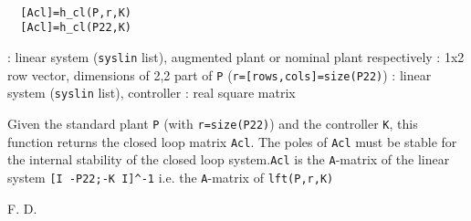 \begin{mandesc}
   \\ %
\end{mandesc}
\begin{calling_sequence}
\begin{verbatim}
  [Acl]=h_cl(P,r,K)  
  [Acl]=h_cl(P22,K)  
\end{verbatim}
\end{calling_sequence}
\begin{parameters}
  \begin{varlist}
    : linear system (\verb!syslin! list), augmented plant or nominal plant respectively
    : 1x2 row vector, dimensions of 2,2 part of \verb!P! (\verb!r=[rows,cols]=size(P22)!)
    : linear system (\verb!syslin! list), controller
    : real square matrix
  \end{varlist}
\end{parameters}
\begin{mandescription}
  Given the standard plant \verb!P! (with \verb!r=size(P22)!) and the controller
  \verb!K!, this function returns the closed loop matrix \verb!Acl!.  The poles
  of \verb!Acl! must be stable for the internal stability of the closed loop
  system.\verb!Acl! is the \verb!A!-matrix of the linear system
  \verb![I -P22;-K I]^-1! i.e.  the \verb!A!-matrix of \verb!lft(P,r,K)!
\end{mandescription}
\begin{manseealso}
\end{manseealso}
\begin{authors}
  F. D.  
\end{authors}
